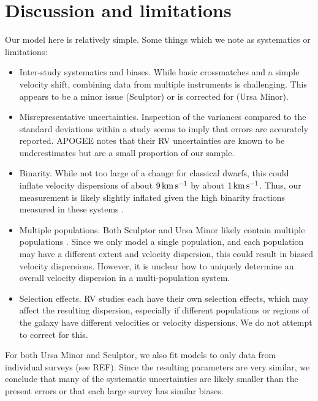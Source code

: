 \section{Discussion and limitations}\label{discussion-and-limitations}

Our model here is relatively simple. Some things which we note as
systematics or limitations:

\begin{itemize}
\tightlist
\item
  Inter-study systematics and biases. While basic crossmatches and a
  simple velocity shift, combining data from multiple instruments is
  challenging. This appears to be a minor issue (Sculptor) or is
  corrected for (Ursa Minor).
\item
  Misrepresentative uncertainties. Inspection of the variances compared
  to the standard deviations within a study seems to imply that errors
  are accurately reported. APOGEE notes that their RV uncertainties are
  known to be underestimates but are a small proportion of our sample.
\item
  Binarity. While not too large of a change for classical dwarfs, this
  could inflate velocity dispersions of about \(9\,{\rm km\,s^{-1}}\) by about
  \(1\,{\rm km\,s^{-1}}\)\citep{spencer+2017}. Thus, our measurement is likely
  slightly inflated given the high binarity fractions measured in these
  systems \citep[\citet{spencer+2018}]{arroyo-polonio+2023}.
\item
  Multiple populations. Both Sculptor and Ursa Minor likely contain
  multiple populations \citep[\citet{pace+2020},
  \citet{tolstoy+2004}]{arroyo-polonio+2024}. Since we only model a
  single population, and each population may have a different extent and
  velocity dispersion, this could result in biased velocity dispersions.
  However, it is unclear how to uniquely determine an overall velocity
  dispersion in a multi-population system.
\item
  Selection effects. RV studies each have their own selection effects,
  which may affect the resulting dispersion, especially if different
  populations or regions of the galaxy have different velocities or
  velocity dispersions. We do not attempt to correct for this.
\end{itemize}

For both Ursa Minor and Sculptor, we also fit models to only data from
individual surveys (see REF). Since the resulting parameters are very
similar, we conclude that many of the systematic uncertainties are
likely smaller than the present errors or that each large survey has
similar biases.

